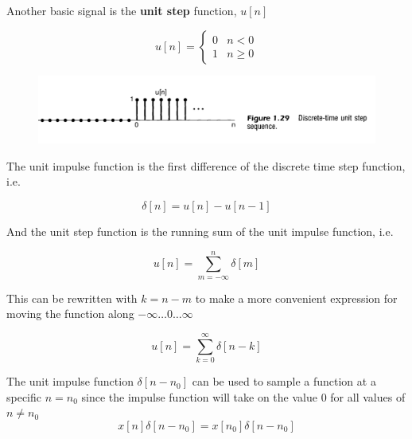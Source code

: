 \documentclass[10pt]{article}
\begin{document}
Another basic signal is the \textbf{unit step} function, $ u[n] $

\begin{definition}
	
\begin{equation}
	u[n] = \begin{cases}
		0 & n < 0 \\
		1 & n \geq 0
	\end{cases}
\end{equation}
\begin{figure}[H]
	\centering
	\includegraphics[width=0.8\linewidth]{img/image_2022-09-16-14-13-03.png}
\end{figure}
\end{definition}


The unit impulse function is the first difference of the discrete time step function, i.e.

\begin{equation}
	\delta[n] = u[n] - u[n-1]
\end{equation}

And the unit step function is the running sum of the unit impulse function, i.e.

\begin{equation}
	u[n] = \sum_{m=-\infty}^n \delta[m]
\end{equation}

This can be rewritten with $ k = n-m $ to make a more convenient expression for moving the function along $ -\infty\ldots0\ldots\infty $ 

\begin{equation}
	u[n] = \sum_{k=0}^\infty \delta[n-k]
\end{equation}




\begin{theorem}
	
The unit impulse function $ \delta[n-n_0] $ can be used to sample a function at a specific $ n = n_0 $ since the impulse function will take on the value $ 0 $ for all values of $ n \neq  n_0$ 
\begin{equation}
	x[n] \delta[n-n_0] = x[n_0]\delta[n-n_0]
\end{equation}
\end{theorem}
\end{document}
